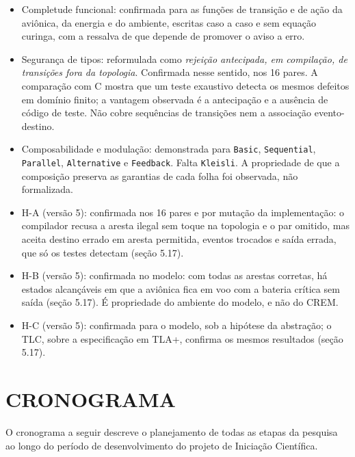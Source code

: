 \documentclass[12pt,a4paper]{article}
\begin{document}
\begin{itemize}
\item Completude funcional: confirmada para as funções de transição e de ação da aviônica, da energia e do ambiente, escritas caso a caso e sem equação curinga, com a ressalva de que depende de promover o aviso a erro.
\item Segurança de tipos: reformulada como \textit{rejeição antecipada, em compilação, de transições fora da topologia}. Confirmada nesse sentido, nos 16 pares. A comparação com C mostra que um teste exaustivo detecta os mesmos defeitos em domínio finito; a vantagem observada é a antecipação e a ausência de código de teste. Não cobre sequências de transições nem a associação evento-destino.
\item Composabilidade e modulação: demonstrada para \texttt{Basic}, \texttt{Sequential}, \texttt{Parallel}, \texttt{Alternative} e \texttt{Feedback}. Falta \texttt{Kleisli}. A propriedade de que a composição preserva as garantias de cada folha foi observada, não formalizada.
\item H-A (versão 5): confirmada nos 16 pares e por mutação da implementação: o compilador recusa a aresta ilegal sem toque na topologia e o par omitido, mas aceita destino errado em aresta permitida, eventos trocados e saída errada, que só os testes detectam (seção 5.17).
\item H-B (versão 5): confirmada no modelo: com todas as arestas corretas, há estados alcançáveis em que a aviônica fica em voo com a bateria crítica sem saída (seção 5.17). É propriedade do ambiente do modelo, e não do CREM.
\item H-C (versão 5): confirmada para o modelo, sob a hipótese da abstração; o TLC, sobre a especificação em TLA+, confirma os mesmos resultados (seção 5.17).
\end{itemize}

\section{CRONOGRAMA}

O cronograma a seguir descreve o planejamento de todas as etapas da pesquisa ao longo do período de desenvolvimento do projeto de Iniciação Científica.
\end{document}
